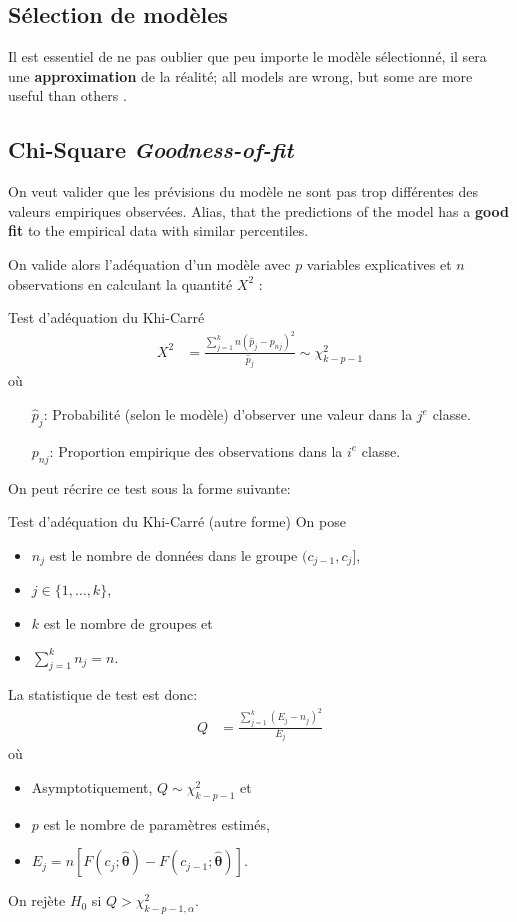 \documentclass[10pt, french]{article}
\begin{document}
\begin{multicols*}{3}
\setcounter{section}{14}
\section{Sélection de modèles}

Il est essentiel de ne pas oublier que peu importe le modèle sélectionné, il sera une \textbf{approximation} de la réalité; \guillemotleft all models are wrong, but some are more useful than others \guillemotright.

\subsection*{Chi-Square \emph{Goodness-of-fit}}

On veut valider que les prévisions du modèle ne sont pas trop différentes des valeurs empiriques observées. 
Alias, that the predictions of the model has a \textbf{good fit} to the empirical data with similar percentiles.

On valide alors l'adéquation d'un modèle avec $p$ variables explicatives et $n$ observations en calculant la quantité $X^2$ : 
\begin{algo}{Test d'adéquation du Khi-Carré}
\begin{align*}
	X^2 
	&= 	\frac{\sum_{j = 1}^{k} n(\hat{p}_j - p_{nj})^2 }{\hat{p}_j} 
	\sim	\chi^{2}_{k - p - 1}
\end{align*}
où 
\begin{enumerate}
	\item[$\hat{p}_j$:]	Probabilité (selon le modèle) d'observer une valeur dans la $j^{e}$ classe.
	\item[$p_{nj}$:]	Proportion empirique des observations dans la $i^{e}$ classe.
\end{enumerate}
\end{algo}


On peut récrire ce test sous la forme suivante:
\begin{algo}{Test d'adéquation du Khi-Carré (autre forme)}
On pose 
\begin{itemize}
	\item	$n_{j}$ est le nombre de données dans le groupe $(c_{j - 1}, c_{j}]$,
	\item	$j \in \{1, \dots, k \}$,
	\item	$k$ est le nombre de groupes et
	\item	$\sum_{j = 1}^{k}n_{j} = n$.
\end{itemize}

La statistique de test est donc:
\begin{align*}
	Q 
	&= 	\frac{\sum_{j = 1}^{k} (E_j - n_{j})^2 }{E_j} 
\end{align*}
où
\begin{itemize}
	\item	Asymptotiquement, $Q \sim	\chi^{2}_{k - p - 1}$ et 
	\item	$p$ est le nombre de paramètres estimés,
	\item	$E_{j} = n [F(c_{j}; \hat{\bm\theta}) - F(c_{j - 1}; \hat{\bm\theta})]$.
\end{itemize}
On rejète $H_{0}$ si $Q > \chi_{k - p - 1, \alpha}^{2}$.
\end{algo}


\end{multicols*}
\end{document}
